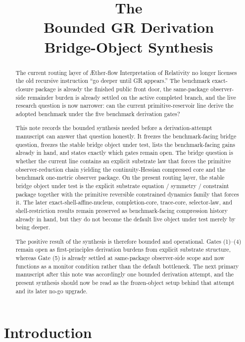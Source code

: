 \documentclass[11pt]{article}
\title{\textbf{The \TheoryName{}}\\[0.4em]
\large Bounded GR Derivation\\
\large Bridge-Object Synthesis}
\author{}
\date{}
\newcommand{\Aflow}{\AE{}ther-flow}
\newcommand{\TheoryName}{\Aflow{} Interpretation of Relativity}
\begin{document}
\maketitle

\begin{abstract}
The current routing layer of \TheoryName{} no longer licenses the old recursive instruction ``go deeper until GR appears.'' The benchmark exact-closure package is already the finished public front door, the same-package observer-side remainder burden is already settled on the active completed branch, and the live research question is now narrower: can the current primitive-reservoir line derive the adopted benchmark under the five benchmark derivation gates?

This note records the bounded synthesis needed before a derivation-attempt manuscript can answer that question honestly. It freezes the benchmark-facing bridge question, freezes the stable bridge object under test, lists the benchmark-facing gains already in hand, and states exactly which gates remain open. The bridge question is whether the current line contains an explicit substrate law that forces the primitive observer-reduction chain yielding the continuity-Hessian compressed core and the benchmark one-metric observer package. On the present routing layer, the stable bridge object under test is the explicit substrate equation / symmetry / constraint package together with the primitive reversible constrained dynamics family that forces it. The later exact-shell-affine-nucleus, completion-core, trace-core, selector-law, and shell-restriction results remain preserved as benchmark-facing compression history already in hand, but they do not become the default live object under test merely by being deeper.

The positive result of the synthesis is therefore bounded and operational. Gates (1)--(4) remain open as first-principles derivation burdens from explicit substrate structure, whereas Gate (5) is already settled at same-package observer-side scope and now functions as a monitor condition rather than the default bottleneck. The next primary manuscript after this note was accordingly one bounded derivation attempt, and the present synthesis should now be read as the frozen-object setup behind that attempt and its later no-go upgrade.
\end{abstract}

\section{Introduction}
\end{document}
